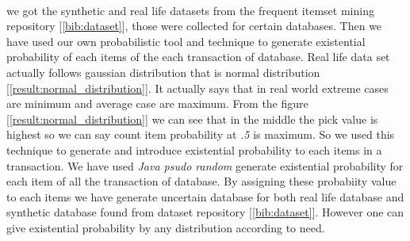 \paragraph*{}

we got the synthetic and real life datasets from the frequent itemset mining repository [\ref{bib:dataset}], those were collected for certain databases. Then we have used our own probabilistic tool and technique to generate existential probability of each items of the each transaction of database. Real life data set actually follows gaussian distribution that is normal distribution [\ref{result:normal_distribution}]. It actually says that in real world extreme cases are minimum and average case are maximum. From the figure [\ref{result:normal_distribution}] we can see that in the middle the pick value is highest so we can say count item probability at \emph{.5} is maximum. So we used this technique to generate and introduce existential probability to each items in a transaction. We have used \emph{Java psudo random} generate existential probability for each item of all the transaction of database. By assigning these probabiity value to each items we have generate uncertain database for both real life database and synthetic database found from dataset repository [\ref{bib:dataset}]. However one can give existential probability by any distribution according to need. 

%